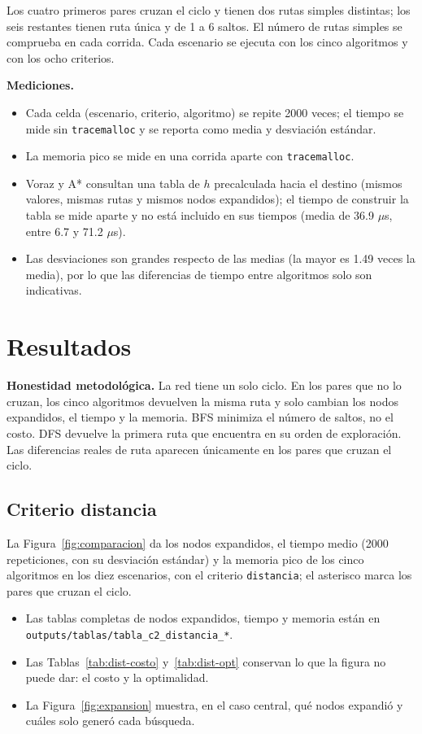 \documentclass[12pt,a4paper]{article}
\begin{document}
Los cuatro primeros pares cruzan el ciclo y tienen dos rutas simples
distintas; los seis restantes tienen ruta única y de 1 a 6 saltos. El número
de rutas simples se comprueba en cada corrida. Cada escenario se ejecuta con
los cinco algoritmos y con los ocho criterios.

\textbf{Mediciones.}
\begin{itemize}
\item Cada celda (escenario, criterio, algoritmo) se repite 2000 veces; el
tiempo se mide sin \texttt{tracemalloc} y se reporta como media y desviación
estándar.
\item La memoria pico se mide en una corrida aparte con \texttt{tracemalloc}.
\item Voraz y A* consultan una tabla de $h$ precalculada hacia el destino
(mismos valores, mismas rutas y mismos nodos expandidos); el tiempo de
construir la tabla se mide aparte y no está incluido en sus tiempos (media de
36.9 $\mu$s, entre 6.7 y 71.2 $\mu$s).
\item Las desviaciones son grandes respecto de las medias (la mayor es 1.49
veces la media), por lo que las diferencias de tiempo entre algoritmos solo son
indicativas.
\end{itemize}

\section{Resultados}

\textbf{Honestidad metodológica.} La red tiene un solo ciclo. En los pares que
no lo cruzan, los cinco algoritmos devuelven la misma ruta y solo cambian los
nodos expandidos, el tiempo y la memoria. BFS minimiza el número de saltos, no
el costo. DFS devuelve la primera ruta que encuentra en su orden de
exploración. Las diferencias reales de ruta aparecen únicamente en los pares
que cruzan el ciclo.

\subsection{Criterio distancia}

La Figura~\ref{fig:comparacion} da los nodos expandidos, el tiempo medio
(2000 repeticiones, con su desviación estándar) y la memoria pico de los cinco
algoritmos en los diez escenarios, con el criterio \texttt{distancia}; el
asterisco marca los pares que cruzan el ciclo.
\begin{itemize}
\item Las tablas completas de nodos expandidos, tiempo y memoria están en
\nolinkurl{outputs/tablas/tabla_c2_distancia_*}.
\item Las Tablas~\ref{tab:dist-costo} y~\ref{tab:dist-opt} conservan lo que la
figura no puede dar: el costo y la optimalidad.
\item La Figura~\ref{fig:expansion} muestra, en el caso central, qué nodos
expandió y cuáles solo generó cada búsqueda.
\end{itemize}
\end{document}
